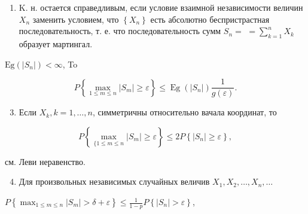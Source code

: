 \documentclass[10pt]{article}
\begin{document}
\begin{enumerate}

  \item K. н. остается справедливым, если условие взаимной независимости величин $X_{n}$ заменить условием, что $\left\{X_{n}\right\}$ есть абсолютно беспристрастная последовательность, т. е. что последовательность сумм $S_{n}=$ $=\sum_{k=1}^{n} X_{k}$ образует мартингал.

\end{enumerate}



$\mathrm{Eg}\left(\left|S_{n}\right|\right)<\infty$, To



\[

P\left\{\max _{1 \leqslant m \leqslant n}\left|S_{m}\right| \geqslant \varepsilon\right\} \leqslant \operatorname{Eg}\left(\left|S_{n}\right|\right) \frac{1}{g(\varepsilon)} .

\]



\begin{enumerate}

  \setcounter{enumi}{2}

  \item Если $X_{k}, k=1, \ldots, n$, симметричны относительно вачала координат, то

\end{enumerate}



\[

P\left\{\max _{\{1 \leqslant m \leqslant n}\left|S_{m}\right| \geqslant \varepsilon\right\} \leqslant 2 P\left\{\left|S_{n}\right| \geqslant \varepsilon\right\},

\]



см. Леви неравенство.



\begin{enumerate}

  \setcounter{enumi}{3}

  \item Для произвольных независимых случайных величив $X_{1}, X_{2}, \ldots, X_{n}, \ldots$

\end{enumerate}



$P\left\{\max _{1 \leqslant m \leqslant n}\left|S_{m}\right|>\delta+\varepsilon\right\} \leqslant \frac{1}{1-p} P\left\{\left|S_{n}\right|>\varepsilon\right\}$,
\end{document}
